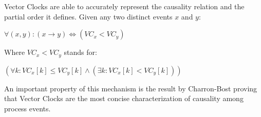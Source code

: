 Vector Clocks are able to accurately represent the
causality relation and the partial order it defines. Given any two
distinct events $x$ and $y$:

\begin{center}
\begin{math}
	\forall(x,y):(x\rightarrow y) \Longleftrightarrow (VC_x < VC_y)
\end{math}
\end{center}
Where $VC_x < VC_y$ stands for:
\begin{center}
  \begin{math}
    (\forall k: VC_x[k] \leq VC_y[k] \wedge (\exists k : VC_x[k]< VC_y[k]))
  \end{math}
\end{center}

An important property of this mechanism is the result by Charron-Bost
\cite{charron1991concerning} proving that Vector Clocks are the most
concise characterization of causality among process events.

